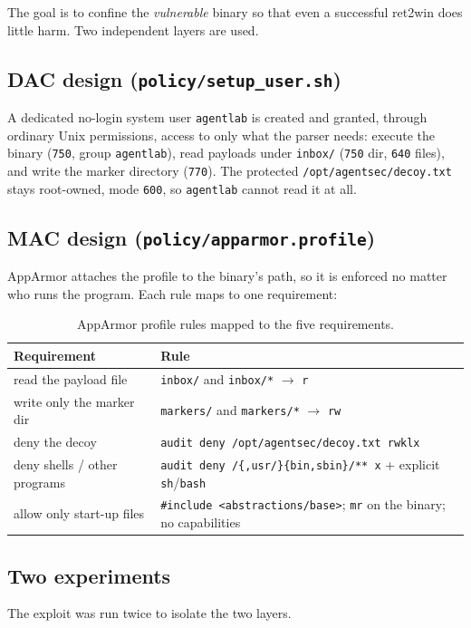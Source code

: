 \documentclass[11pt]{article}
\newcommand{\file}[1]{\texttt{#1}}
\begin{document}
The goal is to confine the \emph{vulnerable} binary so that even a successful
ret2win does little harm. Two independent layers are used.

\subsection{DAC design (\file{policy/setup\_user.sh})}
A dedicated no-login system user \texttt{agentlab} is created and granted,
through ordinary Unix permissions, access to only what the parser needs:
execute the binary (\texttt{750}, group \texttt{agentlab}), read payloads under
\file{inbox/} (\texttt{750} dir, \texttt{640} files), and write the marker
directory (\texttt{770}). The protected \file{/opt/agentsec/decoy.txt} stays
root-owned, mode \texttt{600}, so \texttt{agentlab} cannot read it at all.

\subsection{MAC design (\file{policy/apparmor.profile})}
AppArmor attaches the profile to the binary's path, so it is enforced no matter
who runs the program. Each rule maps to one requirement:

\begin{table}[H]
\centering\small
\begin{tabular}{ll}
\toprule
\textbf{Requirement} & \textbf{Rule} \\
\midrule
read the payload file & \file{inbox/} and \file{inbox/*} $\rightarrow$ \texttt{r} \\
write only the marker dir & \file{markers/} and \file{markers/*} $\rightarrow$ \texttt{rw} \\
deny the decoy & \texttt{audit deny /opt/agentsec/decoy.txt rwklx} \\
deny shells / other programs & \texttt{audit deny /\{,usr/\}\{bin,sbin\}/** x} + explicit \texttt{sh}/\texttt{bash} \\
allow only start-up files & \texttt{\#include <abstractions/base>}; \texttt{mr} on the binary; no capabilities \\
\bottomrule
\end{tabular}
\caption{AppArmor profile rules mapped to the five requirements.}
\end{table}

\subsection{Two experiments}
The exploit was run twice to isolate the two layers.
\end{document}
